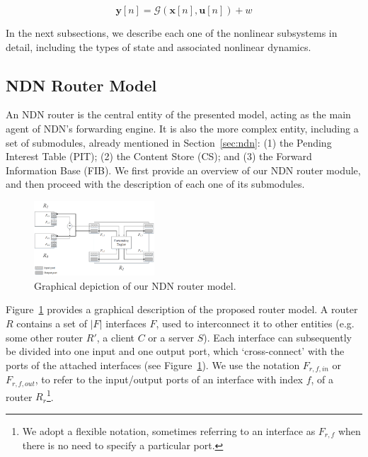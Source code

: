 \begin{equation}
    \textbf{y}[n] = \mathcal{G}(\textbf{x}[n],\textbf{u}[n]) + w
    \label{eq:clients}
\end{equation}%

In the next subsections, we describe each one of the nonlinear subsystems in 
detail, including the types of state and associated nonlinear dynamics.

\subsection{NDN Router Model}
\label{subsec:meth-overview}

An NDN router is the central entity of the presented model, acting 
as the main agent of NDN's forwarding engine. It is also the more complex entity, 
including a set of submodules, already 
mentioned in Section~\ref{sec:ndn}: (1) the Pending Interest Table (PIT); (2) 
the Content Store (CS); and (3) the Forward Information Base (FIB). We first 
provide an overview of our NDN router module, and then proceed with the description 
of each one of its submodules.\shortvertbreak

\begin{figure}[h!]

    \centering
    \includegraphics[width=0.40\textwidth]{figures/ndn-router-overview.png}
    \cprotect\caption{Graphical depiction of our NDN router model.}
    \label{fig:ndn-router-overview}

\end{figure}

Figure~\ref{fig:ndn-router-overview} provides a graphical description of the proposed 
router model. A router $R$ contains a set of $|F|$ interfaces $F$, used to interconnect 
it to other entities (e.g. some other router $R'$, a client $C$ or a server 
$S$). Each interface can subsequently be divided into one input and one output 
port, which `cross-connect' with the ports of the attached 
interfaces (see Figure~\ref{fig:ndn-router-overview}). We use the notation 
$F_{r,f,in}$ or $F_{r,f,out}$, to refer to the 
input\slash output ports of an interface with index $f$, of a router $R_r$\footnote{We 
adopt a flexible notation, sometimes referring to an interface as 
$F_{r,f}$ when there is no need to specify a particular port.}.\shortvertbreak

